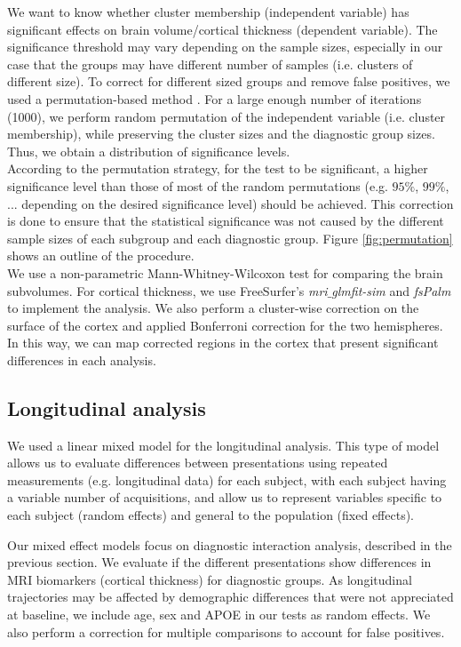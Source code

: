 We want to know whether cluster membership (independent variable) has significant effects on brain volume/cortical thickness (dependent variable). The significance threshold may vary depending on the sample sizes, especially in our case that the groups may have different number of samples (i.e. clusters of different size). To correct for different sized groups and remove false positives, we used a permutation-based method \cite{Good2000}. For a large enough number of iterations (1000), we perform random permutation of the independent variable (i.e. cluster membership), while preserving the cluster sizes and the diagnostic group sizes. Thus, we obtain a distribution of significance levels. \\

According to the permutation strategy, for the test to be significant, a higher significance level than those of most of the random permutations (e.g. $95\%$, $99\%$, ... depending on the desired significance level) should be achieved. This correction is done to ensure that the statistical significance was not caused by the different sample sizes of each subgroup and each diagnostic group. Figure \ref{fig:permutation} shows an outline of the procedure. \\

We use a non-parametric Mann-Whitney-Wilcoxon test for comparing the brain subvolumes. For cortical thickness, we use FreeSurfer's \textit{mri$\_$glmfit-sim} and \textit{fsPalm} to implement the analysis. We also perform a cluster-wise correction on the surface of the cortex and applied Bonferroni correction for the two hemispheres. In this way, we can map corrected regions in the cortex that present significant differences in each analysis. \\

\subsection{Longitudinal analysis}
We used a linear mixed model for the longitudinal analysis. This type of model allows us to evaluate differences between presentations using repeated measurements (e.g. longitudinal data) for each subject, with each subject having a variable number of acquisitions, and allow us to represent variables specific to each subject (random effects) and general to the population (fixed effects).

Our mixed effect models focus on diagnostic interaction analysis, described in the previous section. We evaluate if the different presentations show differences in MRI biomarkers (cortical thickness) for diagnostic groups. As longitudinal trajectories may be affected by demographic differences that were not appreciated at baseline, we include age, sex and APOE in our tests as random effects. We also perform a correction for multiple comparisons to account for false positives.

